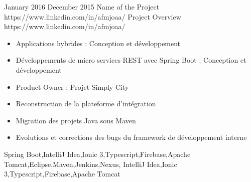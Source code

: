 
\horizontalLine
\begin{universalList}
  \universalListItem
    {January 2016}
    {December 2015}
    {Name of the Project}
    {https://www.linkedin.com/in/afmjoaa/}
    {Project Overview}
    {https://www.linkedin.com/in/afmjoaa/}
    {
      \begin{itemize}
        \item Applications hybrides : Conception et développement
        \item Développements de micro services REST avec Spring Boot : Conception et développement
        \item Product Owner : Projet Simply City
        \item Reconstruction de la plateforme d'intégration
        \item Migration des projets Java sous Maven
        \item Evolutions et corrections des bugs du framework de développement interne
      \end{itemize}
    }
    {Spring Boot,IntelliJ Idea,Ionic 3,Typescript,Firebase,Apache Tomcat,Eclipse,Maven,Jenkins,Nexus, IntelliJ Idea,Ionic 3,Typescript,Firebase,Apache Tomcat}
\end{universalList}
